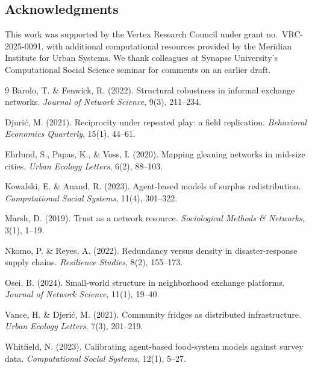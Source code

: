 \documentclass[10pt,twocolumn]{article}
\begin{document}
\subsection*{Acknowledgments}
This work was supported by the Vertex Research Council under grant no.\
VRC-2025-0091, with additional computational resources provided by the
Meridian Institute for Urban Systems. We thank colleagues at Synapse
University's Computational Social Science seminar for comments on an
earlier draft.

\begin{thebibliography}{9}
\small
{} Barolo, T. \& Fenwick, R. (2022). Structural
  robustness in informal exchange networks. \emph{Journal of Network
  Science}, 9(3), 211--234.

 Djuri\'{c}, M. (2021). Reciprocity under repeated
  play: a field replication. \emph{Behavioral Economics Quarterly}, 15(1),
  44--61.

 Ehrlund, S., Papas, K., \& Voss, I. (2020). Mapping
  gleaning networks in mid-size cities. \emph{Urban Ecology Letters},
  6(2), 88--103.

 Kowalski, E. \& Anand, R. (2023). Agent-based
  models of surplus redistribution. \emph{Computational Social Systems},
  11(4), 301--322.

 Marsh, D. (2019). Trust as a network resource.
  \emph{Sociological Methods \& Networks}, 3(1), 1--19.

 Nkomo, P. \& Reyes, A. (2022). Redundancy versus
  density in disaster-response supply chains. \emph{Resilience Studies},
  8(2), 155--173.

 Osei, B. (2024). Small-world structure in
  neighborhood exchange platforms. \emph{Journal of Network Science},
  11(1), 19--40.

 Vance, H. \& Djeri\'{c}, M. (2021). Community
  fridges as distributed infrastructure. \emph{Urban Ecology Letters},
  7(3), 201--219.

 Whitfield, N. (2023). Calibrating agent-based
  food-system models against survey data. \emph{Computational Social
  Systems}, 12(1), 5--27.
\end{thebibliography}
\end{document}
